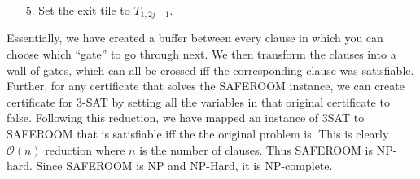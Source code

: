 {\begin{enumerate}
\begin{enumerate}
            \item Same for $T_{2,2j}$ and $b$.
            \item Same for $T_{3,2j}$ and $c$.
        \end{enumerate}
        \item [5.] Set the exit tile to $T_{1,2j+1}$.
    \end{enumerate}
    Essentially, we have created a buffer between every clause in which you can choose which ``gate'' to go through next. We then transform the clauses into a wall of gates, which can all be crossed iff the corresponding clause was satisfiable. Further, for any certificate that solves the SAFEROOM instance, we can create certificate for 3-SAT by setting all the variables in that original certificate to false. Following this reduction, we have mapped an instance of 3SAT to SAFEROOM that is satisfiable iff the the original problem is.  This is clearly $\mathcal{O}(n)$ reduction where $n$ is the number of clauses. Thus SAFEROOM is NP-hard.\newp
    Since SAFEROOM is NP and NP-Hard, it is NP-complete.
}